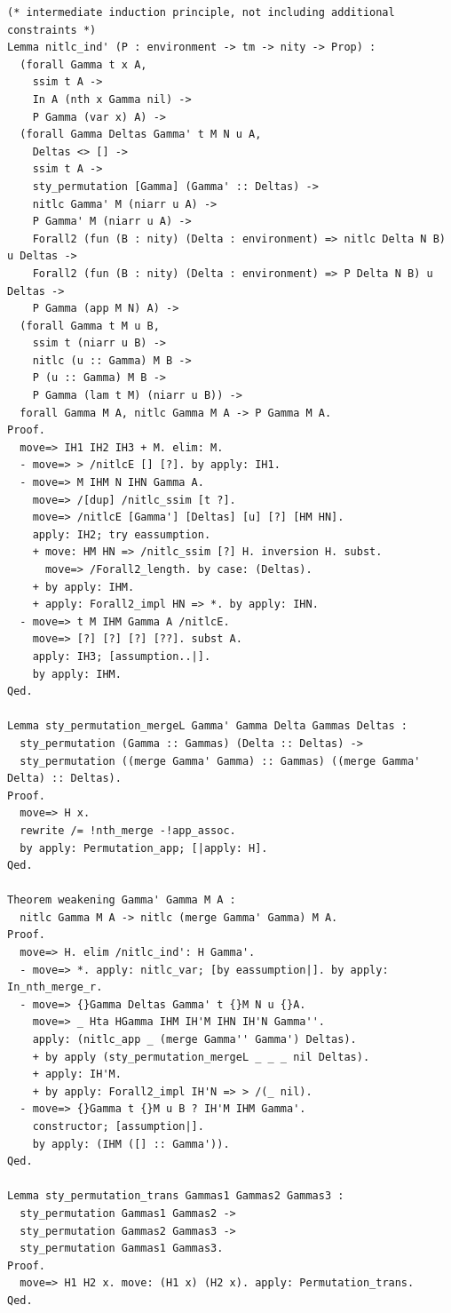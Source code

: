 \documentclass[10pt,a4paper]{article}
\begin{document}
\begin{lstlisting}[style=authorcoq]
(* intermediate induction principle, not including additional constraints *)
Lemma nitlc_ind' (P : environment -> tm -> nity -> Prop) :
  (forall Gamma t x A,
    ssim t A ->
    In A (nth x Gamma nil) -> 
    P Gamma (var x) A) ->
  (forall Gamma Deltas Gamma' t M N u A,
    Deltas <> [] ->
    ssim t A ->
    sty_permutation [Gamma] (Gamma' :: Deltas) ->
    nitlc Gamma' M (niarr u A) ->
    P Gamma' M (niarr u A) ->
    Forall2 (fun (B : nity) (Delta : environment) => nitlc Delta N B) u Deltas ->
    Forall2 (fun (B : nity) (Delta : environment) => P Delta N B) u Deltas ->
    P Gamma (app M N) A) ->
  (forall Gamma t M u B,
    ssim t (niarr u B) ->
    nitlc (u :: Gamma) M B ->
    P (u :: Gamma) M B ->
    P Gamma (lam t M) (niarr u B)) ->
  forall Gamma M A, nitlc Gamma M A -> P Gamma M A.
Proof.
  move=> IH1 IH2 IH3 + M. elim: M.
  - move=> > /nitlcE [] [?]. by apply: IH1.
  - move=> M IHM N IHN Gamma A.
    move=> /[dup] /nitlc_ssim [t ?].
    move=> /nitlcE [Gamma'] [Deltas] [u] [?] [HM HN].
    apply: IH2; try eassumption.
    + move: HM HN => /nitlc_ssim [?] H. inversion H. subst.
      move=> /Forall2_length. by case: (Deltas).
    + by apply: IHM.
    + apply: Forall2_impl HN => *. by apply: IHN.
  - move=> t M IHM Gamma A /nitlcE.
    move=> [?] [?] [?] [??]. subst A.
    apply: IH3; [assumption..|].
    by apply: IHM.
Qed.

Lemma sty_permutation_mergeL Gamma' Gamma Delta Gammas Deltas :
  sty_permutation (Gamma :: Gammas) (Delta :: Deltas) ->
  sty_permutation ((merge Gamma' Gamma) :: Gammas) ((merge Gamma' Delta) :: Deltas).
Proof.
  move=> H x.
  rewrite /= !nth_merge -!app_assoc.
  by apply: Permutation_app; [|apply: H].
Qed.

Theorem weakening Gamma' Gamma M A :
  nitlc Gamma M A -> nitlc (merge Gamma' Gamma) M A.
Proof.
  move=> H. elim /nitlc_ind': H Gamma'.
  - move=> *. apply: nitlc_var; [by eassumption|]. by apply: In_nth_merge_r.
  - move=> {}Gamma Deltas Gamma' t {}M N u {}A.
    move=> _ Hta HGamma IHM IH'M IHN IH'N Gamma''.
    apply: (nitlc_app _ (merge Gamma'' Gamma') Deltas).
    + by apply (sty_permutation_mergeL _ _ _ nil Deltas).
    + apply: IH'M.
    + by apply: Forall2_impl IH'N => > /(_ nil).
  - move=> {}Gamma t {}M u B ? IH'M IHM Gamma'.
    constructor; [assumption|].
    by apply: (IHM ([] :: Gamma')).
Qed.

Lemma sty_permutation_trans Gammas1 Gammas2 Gammas3 :
  sty_permutation Gammas1 Gammas2 ->
  sty_permutation Gammas2 Gammas3 ->
  sty_permutation Gammas1 Gammas3.
Proof.
  move=> H1 H2 x. move: (H1 x) (H2 x). apply: Permutation_trans.
Qed.


\end{lstlisting}
\end{document}
